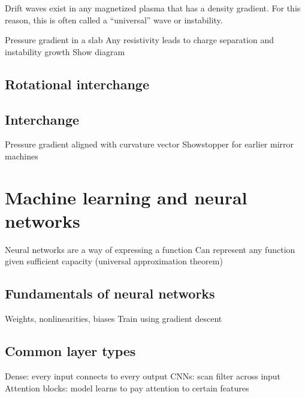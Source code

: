Drift waves exist in any magnetized plasma that has a density gradient. For this reason, this is often called a ``universal'' wave or instability. 

Pressure gradient in a slab
Any resistivity leads to charge separation and instability growth
Show diagram 

\subsection{Rotational interchange}



\subsection{Interchange}

Pressure gradient aligned with curvature vector
Showstopper for earlier mirror machines

\section{Machine learning and neural networks}

Neural networks are a way of expressing a function
Can represent any function given sufficient capacity (universal approximation theorem)

\subsection{Fundamentals of neural networks}

Weights, nonlinearities, biases
Train using gradient descent

\subsection{Common layer types}

Dense: every input connects to every output
CNNs: scan filter across input
Attention blocks: model learns to pay attention to certain features






